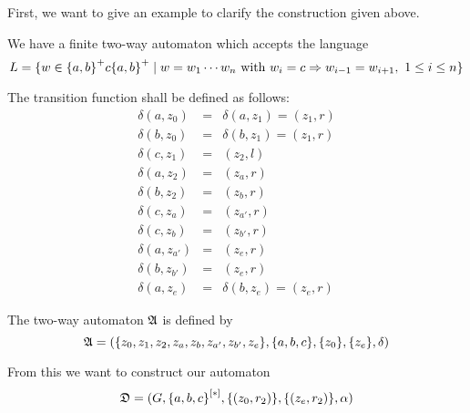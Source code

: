 \bigskip
First, we want to give an example to clarify the construction given above.

We have a finite two-way automaton which accepts the language
\[ L = \mbox{$\{w \in \mbox{$\{a, b\}$}^+ c \mbox{$\{a, b\}$}^+ \mid w = w_1 \cdots w_n
\text{ with } w_i = c \Rightarrow w_{i-1} = w_{i+1},\ 1 \leq i \leq n\}$} \]

The transition function shall be defined as follows:
\begin{eqnarray*}
\delta(a, z_0) &=& \delta(a, z_1) = (z_1, r) \\
\delta(b, z_0) &=& \delta(b, z_1) = (z_1, r) \\
\delta(c, z_1) &=& (z_2, l) \\
\delta(a, z_2) &=& (z_a, r) \\
\delta(b, z_2) &=& (z_b, r) \\
\delta(c, z_a) &=& (z_{a'}, r) \\
\delta(c, z_b) &=& (z_{b'}, r) \\
\delta(a, z_{a'}) &=& (z_e, r) \\
\delta(b, z_{b'}) &=& (z_e, r) \\
\delta(a, z_{e}) &=& \delta(b, z_e) = (z_e, r)
\end{eqnarray*}

The two-way automaton $\mbox{$\mathfrak{A}$}$ is defined by
\[ \mbox{$\mathfrak{A}$} = (\mbox{$\{z_0, z_1, z_2, z_a, z_b, z_{a'}, z_{b'}, z_e\}$}, \mbox{$\{a,
b, c\}$}, \mbox{$\{z_0\}$}, \mbox{$\{z_e\}$}, \delta) \]

From this we want to construct our automaton 
\[ \mbox{$\mathfrak{D}$} = (G, \mbox{${\mbox{$\{a, b, c\}$}}^{[*]}$}, \mbox{$\{(z_0, r_2)\}$}, \mbox{$\{(z_e,
r_2)\}$}, \alpha) \]




























